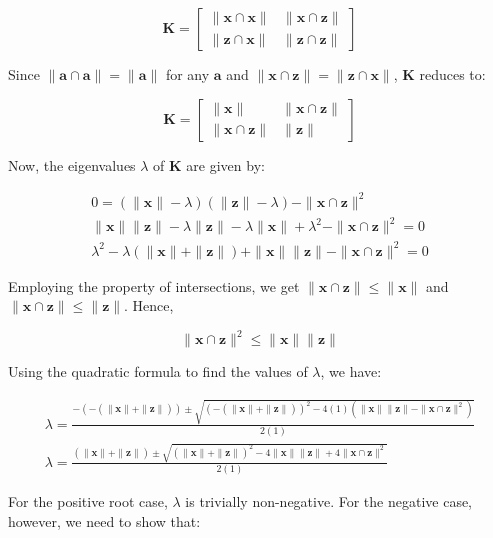 \documentclass[11pt]{article}
\begin{document}
$$
\mathbf{K}=\left[\begin{array}{cc}
\|\mathbf{x} \cap \mathbf{x}\| & \|\mathbf{x} \cap \mathbf{z}\| \\
\|\mathbf{z} \cap \mathbf{x}\| & \|\mathbf{z} \cap \mathbf{z}\|
\end{array}\right]
$$

Since $\|\mathbf{a} \cap \mathbf{a}\|=\|\mathbf{a}\|$ for any $\mathbf{a}$ and $\|\mathbf{x} \cap \mathbf{z}\|=\|\mathbf{z} \cap \mathbf{x}\|$, $\mathbf{K}$ reduces to:

$$
\mathbf{K}=\left[\begin{array}{cc}
\|\mathbf{x}\| & \|\mathbf{x} \cap \mathbf{z}\| \\
\|\mathbf{x} \cap \mathbf{z}\| & \|\mathbf{z}\|
\end{array}\right]
$$

Now, the eigenvalues $\lambda$ of $\mathbf{K}$ are given by:

$$
\begin{gathered}
0=(\|\mathbf{x}\|-\lambda)(\|\mathbf{z}\|-\lambda)-\|\mathbf{x} \cap \mathbf{z}\|^{2} \\
\|\mathbf{x}\|\|\mathbf{z}\|-\lambda\|\mathbf{z}\|-\lambda\|\mathbf{x}\|+\lambda^{2}-\|\mathbf{x} \cap \mathbf{z}\|^{2}=0 \\
\lambda^{2}-\lambda(\|\mathbf{x}\|+\|\mathbf{z}\|)+\|\mathbf{x}\|\|\mathbf{z}\|-\|\mathbf{x} \cap \mathbf{z}\|^{2}=0
\end{gathered}
$$

Employing the property of intersections, we get $\|\mathbf{x} \cap \mathbf{z}\| \leq\|\mathbf{x}\|$ and $\|\mathbf{x} \cap \mathbf{z}\| \leq\|\mathbf{z}\|$. Hence,

$$
\|\mathbf{x} \cap \mathbf{z}\|^{2} \leq\|\mathbf{x}\|\|\mathbf{z}\|
$$

Using the quadratic formula to find the values of $\lambda$, we have:

$$
\begin{gathered}
\lambda=\frac{-(-(\|\mathbf{x}\|+\|\mathbf{z}\|)) \pm \sqrt{(-(\|\mathbf{x}\|+\|\mathbf{z}\|))^{2}-4(1)\left(\|\mathbf{x}\|\|\mathbf{z}\|-\|\mathbf{x} \cap \mathbf{z}\|^{2}\right)}}{2(1)} \\
\lambda=\frac{(\|\mathbf{x}\|+\|\mathbf{z}\|) \pm \sqrt{(\|\mathbf{x}\|+\|\mathbf{z}\|)^{2}-4\|\mathbf{x}\|\|\mathbf{z}\|+4\|\mathbf{x} \cap \mathbf{z}\|^{2}}}{2(1)}
\end{gathered}
$$

For the positive root case, $\lambda$ is trivially non-negative. For the negative case, however, we need to show that:
\end{document}
